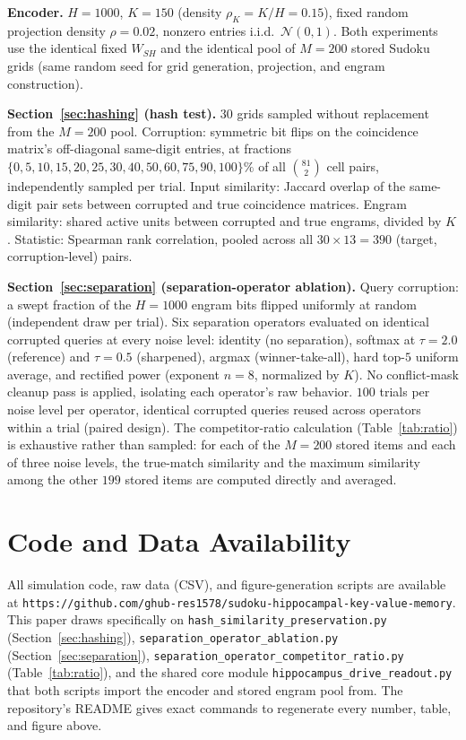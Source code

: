 \documentclass[11pt]{article}
\newcommand{\url}[1]{\texttt{#1}}
\begin{document}
\textbf{Encoder.} $H=1000$, $K=150$ (density $\rho_K = K/H = 0.15$), fixed random projection
density $\rho=0.02$, nonzero entries i.i.d.\ $\mathcal{N}(0,1)$. Both experiments use the
identical fixed $W_{SH}$ and the identical pool of $M=200$ stored Sudoku grids (same random
seed for grid generation, projection, and engram construction).

\textbf{Section~\ref{sec:hashing} (hash test).} $30$ grids sampled without replacement from the
$M=200$ pool. Corruption: symmetric bit flips on the coincidence matrix's off-diagonal
same-digit entries, at fractions $\{0, 5, 10, 15, 20, 25, 30, 40, 50, 60, 75, 90, 100\}\%$ of
all $\binom{81}{2}$ cell pairs, independently sampled per trial. Input similarity: Jaccard
overlap of the same-digit pair sets between corrupted and true coincidence matrices. Engram
similarity: shared active units between corrupted and true engrams, divided by $K$. Statistic:
Spearman rank correlation, pooled across all $30\times13=390$ (target, corruption-level) pairs.

\textbf{Section~\ref{sec:separation} (separation-operator ablation).} Query corruption: a swept
fraction of the $H=1000$ engram bits flipped uniformly at random (independent draw per trial).
Six separation operators evaluated on identical corrupted queries at every noise level:
identity (no separation), softmax at $\tau=2.0$ (reference) and $\tau=0.5$ (sharpened), argmax
(winner-take-all), hard top-$5$ uniform average, and rectified power (exponent $n=8$,
normalized by $K$). No conflict-mask cleanup pass is applied, isolating each operator's raw
behavior. $100$ trials per noise level per operator, identical corrupted queries reused across
operators within a trial (paired design). The competitor-ratio calculation
(Table~\ref{tab:ratio}) is exhaustive rather than sampled: for each of the $M=200$ stored
items and each of three noise levels, the true-match similarity and the maximum similarity
among the other $199$ stored items are computed directly and averaged.

\section*{Code and Data Availability}
All simulation code, raw data (CSV), and figure-generation scripts are available at
\url{https://\allowbreak github.com/\allowbreak ghub-\allowbreak res1578/\allowbreak sudoku-\allowbreak hippocampal-\allowbreak key-\allowbreak value-\allowbreak memory}. This paper draws
specifically on \texttt{hash\_similarity\_preservation.py} (Section~\ref{sec:hashing}),
\texttt{separation\_operator\_ablation.py} (Section~\ref{sec:separation}),
\texttt{separation\_operator\_competitor\_ratio.py} (Table~\ref{tab:ratio}), and the shared
core module \texttt{hippocampus\_drive\_readout.py} that both scripts import the encoder and
stored engram pool from. The repository's README gives exact commands to regenerate every
number, table, and figure above.
\end{document}
